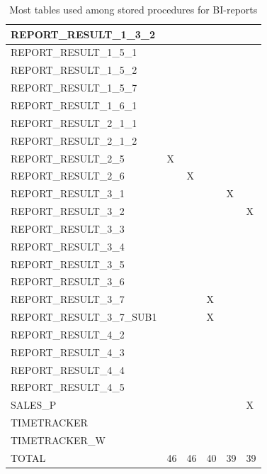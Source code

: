 \documentclass{cslthse-msc}
\begin{document}
\begin{appendices}
\begin{table}[H]
{\begin{tabular}{ l | p{5em} | p{5em}| p{5em}| p{5em}| l  }
	 REPORT\_RESULT\_1\_3\_2 &  &  &  &  &  \\ \hline
	 REPORT\_RESULT\_1\_5\_1 &  &  &  &  &  \\ \hline
	 REPORT\_RESULT\_1\_5\_2 &  &  &  &  &  \\ \hline
	 REPORT\_RESULT\_1\_5\_7 &  &  &  &  &  \\ \hline
	 REPORT\_RESULT\_1\_6\_1 &  &  &  &  &  \\ \hline
	 REPORT\_RESULT\_2\_1\_1 &  &  &  &  &  \\ \hline
	 REPORT\_RESULT\_2\_1\_2 &  &  &  &  &  \\ \hline
	 REPORT\_RESULT\_2\_5 & X &  &  &  &  \\ \hline
	 REPORT\_RESULT\_2\_6 &  & X &  &  &  \\ \hline
	 REPORT\_RESULT\_3\_1 &  &  &  & X &  \\ \hline
	 REPORT\_RESULT\_3\_2 &  &  &  &  & X \\ \hline
	 REPORT\_RESULT\_3\_3 &  &  &  &  &  \\ \hline
	 REPORT\_RESULT\_3\_4 &  &  &  &  &  \\ \hline
	 REPORT\_RESULT\_3\_5 &  &  &  &  &  \\ \hline
	 REPORT\_RESULT\_3\_6 &  &  &  &  &  \\ \hline
	 REPORT\_RESULT\_3\_7 &  &  & X &  &  \\ \hline
	 REPORT\_RESULT\_3\_7\_SUB1 &  &  & X &  &  \\ \hline
	 REPORT\_RESULT\_4\_2 &  &  &  &  &  \\ \hline
	 REPORT\_RESULT\_4\_3 &  &  &  &  &  \\ \hline
	 REPORT\_RESULT\_4\_4 &  &  &  &  &  \\ \hline
	 REPORT\_RESULT\_4\_5 &  &  &  &  &  \\ \hline
	 SALES\_P &  &  &  &  & X \\ \hline
	 TIMETRACKER &  &  &  &  &  \\ \hline
	 TIMETRACKER\_W &  &  &  &  &  \\ \hline
	TOTAL & 46 & 46 & 40 & 39 & 39 \\ \hline

\end{tabular}}
\caption{Most tables used among stored procedures for BI-reports}
\label{tab:mosttab}
\end{table}



\end{appendices}
\end{document}
